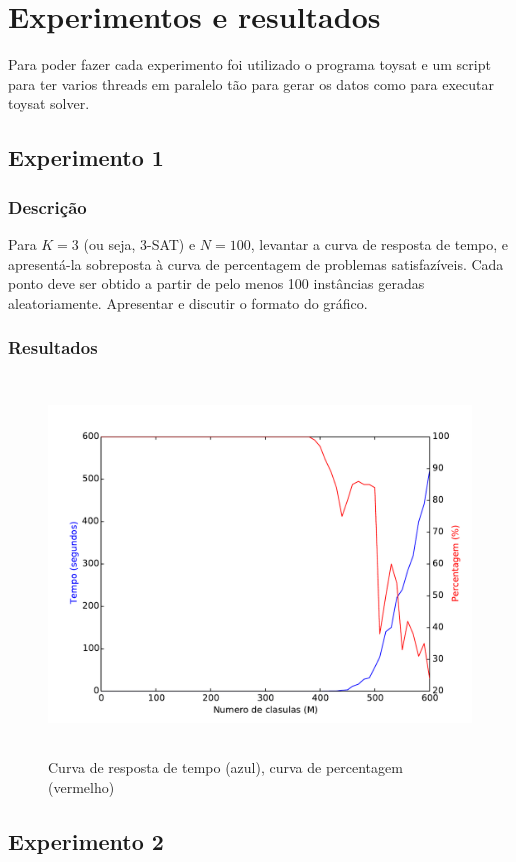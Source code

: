\section{Experimentos e resultados} 

Para poder fazer cada experimento foi utilizado o programa toysat \cite{ToySAT14} e um script para ter varios threads em paralelo tão para gerar os datos como para executar toysat solver.

\subsection{Experimento 1}
	\subsubsection{Descrição}
		Para $K = 3$ (ou seja, 3-SAT) e $N = 100$, levantar a curva de resposta de tempo, e apresentá-la sobreposta à curva de percentagem de problemas satisfazíveis. Cada ponto deve ser obtido a partir de pelo menos 100 instâncias geradas aleatoriamente. Apresentar e discutir o formato do gráfico.
	\subsubsection{Resultados}
		\begin{figure}[H]
			\centering
			\includegraphics[height=10cm]{images/max3sat_100at}
			\caption{Curva de resposta de tempo (azul), curva de percentagem (vermelho)}
			\label{fig:max3sat100at}
		\end{figure}
	
 \subsection{Experimento 2}
